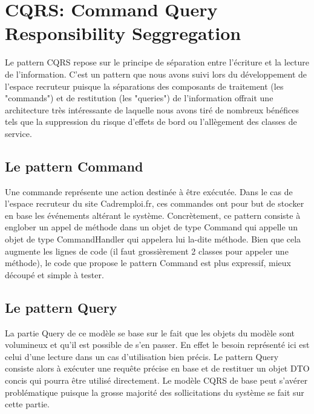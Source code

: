 \section{CQRS: Command Query Responsibility Seggregation}
\label{sec:CQRS: Command Query Responsibility Seggregation}
Le pattern CQRS repose sur le principe de séparation entre l'écriture et la lecture de l'information.
C'est un pattern que nous avons suivi lors du développement de l'espace recruteur puisque la séparations des composants de traitement (les "commands") et de restitution (les "queries") de l'information offrait une architecture très intéressante de laquelle nous avons tiré de nombreux bénéfices tels que la suppression du risque d'effets de bord ou l'allègement des classes de service.
\subsection{Le pattern Command}
\label{sub:Le pattern Command}
Une commande représente une action destinée à être exécutée.
Dans le cas de l'espace recruteur du site Cadremploi.fr, ces commandes ont pour but de stocker en base les événements altérant le système.
Concrètement, ce pattern consiste à englober un appel de méthode dans un objet de type Command qui appelle un objet de type CommandHandler qui appelera lui la-dite méthode.
Bien que cela augmente les lignes de code (il faut grossièrement 2 classes pour appeler une méthode), le code que propose le pattern Command est plus expressif, mieux découpé et simple à tester.
\subsection{Le pattern Query}
\label{sub:Le pattern Query}
La partie Query de ce modèle se base sur le fait que les objets du modèle sont volumineux et qu'il est possible de s'en passer.
En effet le besoin représenté ici est celui d'une lecture dans un cas d'utilisation bien précis.
Le pattern Query consiste alors à exécuter une requête précise en base et de restituer un objet DTO concis qui pourra être utilisé directement.
Le modèle CQRS de base peut s'avérer problématique puisque la grosse majorité des sollicitations du système se fait sur cette partie.
